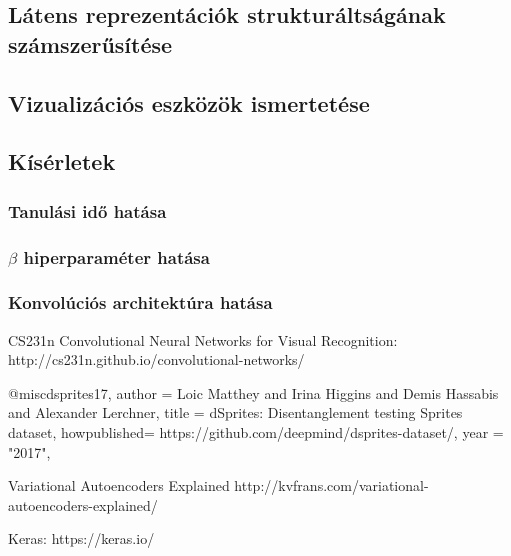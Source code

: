 \documentclass[12pt]{article}
\begin{document}
\subsection{Látens reprezentációk strukturáltságának számszerűsítése}



\subsection{Vizualizációs eszközök ismertetése}



\subsection{Kísérletek}



\subsubsection{Tanulási idő hatása}



\subsubsection{$\beta$ hiperparaméter hatása}



\subsubsection{Konvolúciós architektúra hatása}


\begin{thebibliography}{9}

CS231n Convolutional Neural Networks for Visual Recognition:
http://cs231n.github.io/convolutional-networks/

@misc{dsprites17,
author = {Loic Matthey and Irina Higgins and Demis Hassabis and Alexander Lerchner},
title = {dSprites: Disentanglement testing Sprites dataset},
howpublished= {https://github.com/deepmind/dsprites-dataset/},
year = "2017",
}

Variational Autoencoders Explained
http://kvfrans.com/variational-autoencoders-explained/

Keras:
https://keras.io/

\end{thebibliography}
\end{document}
